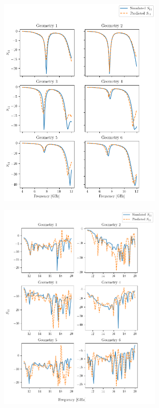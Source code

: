\documentclass[conference]{IEEEtran}
\newenvironment{Figure}
    {\par\medskip\noindent\minipage{\linewidth}}
    {\endminipage\par\medskip}
\begin{document}
\begin{Figure}
    \centering
    \includegraphics[width=3.25in]{unseen_geometries_freq_vs_seq}
    \label{unseen_geometries_graph_p}
\end{Figure}

\begin{Figure}
    \centering
    \includegraphics[width=3.25in]{unseen_geometries_freq_vs_seq_lw}
    \label{unseen_geometries_graph_lw}
\end{Figure}
\end{document}
